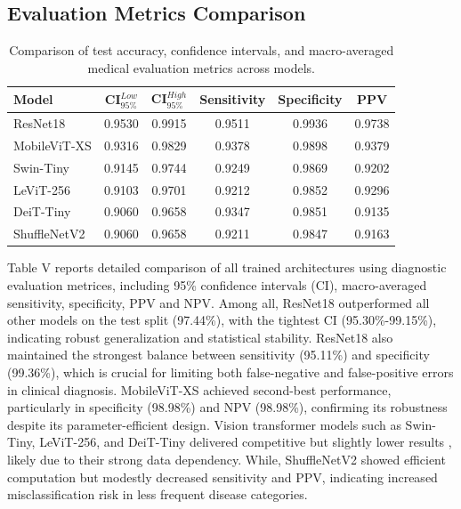 \documentclass[conference,9pt]{IEEEtran}
\begin{document}
\subsection{\textbf{Evaluation Metrics Comparison} }
\begin{table}[H]
\centering
\caption{Comparison of test accuracy, confidence intervals, and macro-averaged medical evaluation metrics across models.}
\label{tab:advanced_metrics}
\begin{tabular}{l c c c c c}
\toprule
\textbf{Model} &
\textbf{CI$_{95\%}^{Low}$} &
\textbf{CI$_{95\%}^{High}$} &
\textbf{Sensitivity} &
\textbf{Specificity} &
\textbf{PPV} \\
\midrule
ResNet18 & 0.9530 & 0.9915 & 0.9511 & 0.9936 & 0.9738 \\
MobileViT-XS & 0.9316 & 0.9829 & 0.9378 & 0.9898 & 0.9379 \\
Swin-Tiny & 0.9145 & 0.9744 & 0.9249 & 0.9869 & 0.9202 \\
LeViT-256 & 0.9103 & 0.9701 & 0.9212 & 0.9852 & 0.9296 \\
DeiT-Tiny & 0.9060 & 0.9658 & 0.9347 & 0.9851 & 0.9135 \\
ShuffleNetV2 & 0.9060 & 0.9658 & 0.9211 & 0.9847 & 0.9163 \\
\bottomrule
\end{tabular}
\end{table}
Table V reports detailed comparison of all trained architectures using diagnostic evaluation metrices, including 95\% confidence intervals (CI), macro-averaged sensitivity, specificity, PPV and NPV. Among all, ResNet18 outperformed all other models on the test split (97.44\%), with the tightest CI (95.30\%-99.15\%), indicating robust generalization and statistical stability. ResNet18 also maintained the strongest balance between sensitivity (95.11\%) and specificity (99.36\%), which is crucial for limiting both false-negative and false-positive errors in clinical diagnosis.
MobileViT-XS achieved second-best performance, particularly in specificity (98.98\%) and NPV (98.98\%), confirming its robustness despite its parameter-efficient design.  Vision transformer models such as Swin-Tiny, LeViT-256, and DeiT-Tiny delivered competitive but slightly lower results , likely due to their strong data dependency. While, ShuffleNetV2 showed efficient computation but modestly decreased sensitivity and PPV, indicating increased misclassification risk in less frequent disease categories. 
\end{document}
